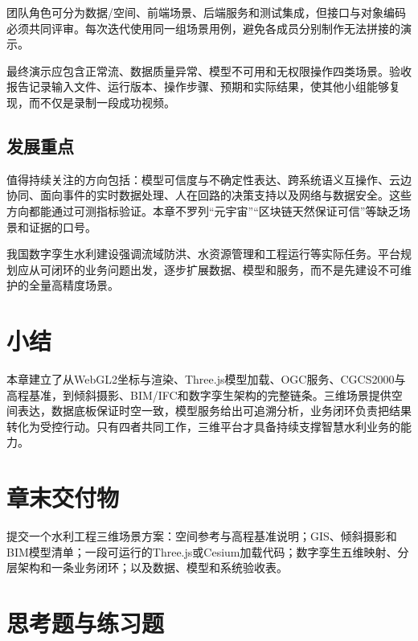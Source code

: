 团队角色可分为数据/空间、前端场景、后端服务和测试集成，但接口与对象编码必须共同评审。每次迭代使用同一组场景用例，避免各成员分别制作无法拼接的演示。

最终演示应包含正常流、数据质量异常、模型不可用和无权限操作四类场景。验收报告记录输入文件、运行版本、操作步骤、预期和实际结果，使其他小组能够复现，而不仅是录制一段成功视频。

\subsection{发展重点}

值得持续关注的方向包括：模型可信度与不确定性表达、跨系统语义互操作、云边协同、面向事件的实时数据处理、人在回路的决策支持以及网络与数据安全。这些方向都能通过可测指标验证。本章不罗列“元宇宙”“区块链天然保证可信”等缺乏场景和证据的口号。

我国数字孪生水利建设强调流域防洪、水资源管理和工程运行等实际任务\cite{twinWater2023,twinProject2024}。平台规划应从可闭环的业务问题出发，逐步扩展数据、模型和服务，而不是先建设不可维护的全量高精度场景。

\section*{小结}

本章建立了从WebGL2坐标与渲染、Three.js模型加载、OGC服务、CGCS2000与高程基准，到倾斜摄影、BIM/IFC和数字孪生架构的完整链条。三维场景提供空间表达，数据底板保证时空一致，模型服务给出可追溯分析，业务闭环负责把结果转化为受控行动。只有四者共同工作，三维平台才具备持续支撑智慧水利业务的能力。

\section*{章末交付物}

提交一个水利工程三维场景方案：空间参考与高程基准说明；GIS、倾斜摄影和BIM模型清单；一段可运行的Three.js或Cesium加载代码；数字孪生五维映射、分层架构和一条业务闭环；以及数据、模型和系统验收表。

\section*{思考题与练习题}

